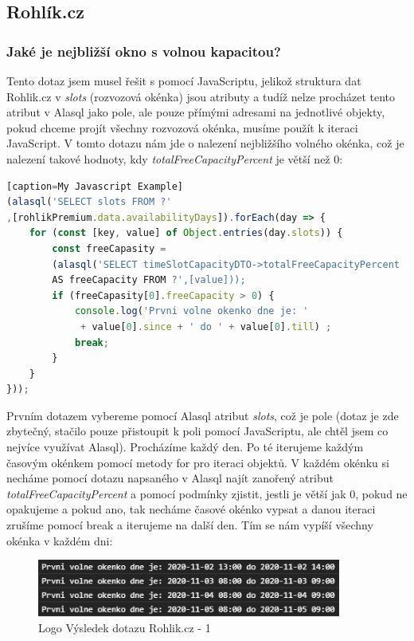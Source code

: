 \documentclass[a4, titlepage]{article}
\begin{document}
\subsection{Rohlík.cz}
\subsubsection{Jaké je nejbližší okno s volnou kapacitou?}
Tento dotaz jsem musel řešit s pomocí JavaScriptu, jelikož struktura dat Rohlik.cz v \textit{slots} (rozvozová okénka) jsou atributy a tudíž nelze procházet tento atribut v Alasql jako pole, ale pouze přímými adresami na jednotlivé objekty, pokud chceme projít všechny rozvozová okénka, musíme použít k iteraci JavaScript. V tomto dotazu nám jde o nalezení nejbližšího volného okénka, což je nalezení takové hodnoty, kdy \textit{totalFreeCapacityPercent} je větší než 0: 
\begin{lstlisting}[language=JavaScript][caption=My Javascript Example]
(alasql('SELECT slots FROM ?'
,[rohlikPremium.data.availabilityDays]).forEach(day => {
    for (const [key, value] of Object.entries(day.slots)) {
        const freeCapasity = 
        (alasql('SELECT timeSlotCapacityDTO->totalFreeCapacityPercent 
        AS freeCapacity FROM ?',[value]));
        if (freeCapasity[0].freeCapacity > 0) {
            console.log('Prvni volne okenko dne je: '
             + value[0].since + ' do ' + value[0].till) ;
            break;
        }
    }
}));
\end{lstlisting}
Prvním dotazem vybereme pomocí Alasql atribut \textit{slots}, což je pole (dotaz je zde zbytečný, stačilo pouze přistoupit k poli pomocí JavaScriptu, ale chtěl jsem co nejvíce využívat Alasql). Procházíme každý den. Po té iterujeme každým časovým okénkem pomocí metody for pro iteraci objektů. V každém okénku si necháme pomocí dotazu napsaného v Alasql najít zanořený atribut \textit{totalFreeCapacityPercent} a pomocí podmínky zjistit, jestli je větší jak 0, pokud ne opakujeme a pokud ano, tak necháme časové okénko vypsat a danou iteraci zrušíme pomocí break a iterujeme na další den. Tím se nám vypíší všechny okénka v každém dni:
\begin{figure}[h]
    \centering
    \includegraphics[width=10cm]{R1}
    \caption{Logo Výsledek dotazu Rohlik.cz - 1}
\end{figure}
\end{document}
